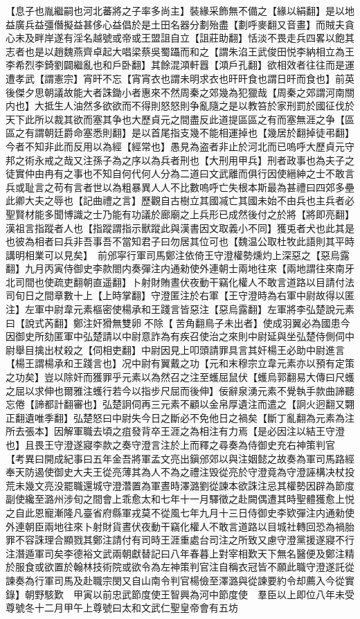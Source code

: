 【息子也胤繼嗣也河北蕃將之子率多尚主】裝緣采飾無不備之【緣以絹翻】是以地益廣兵益彊僭擬益甚侈心益倡於是土田名器分劃殆盡【劃呼麥翻又音畫】而賊夫貪心未及畔岸遂有淫名越號或帝或王盟詛自立【詛莊助翻】恬淡不畏走兵四畧以飽其志者也是以趙魏燕齊卓起大唱梁蔡吳蜀躡而和之【謂朱淊王武俊田悦李納相立為王李希烈李錡劉闢繼亂也和戶卧翻】其餘混澒軒囂【澒戶孔翻】欲相效者往往而是運遭孝武【謂憲宗】宵旰不忘【宵宵衣也謂未明求衣也旰旰食也謂日旰而食也】前英後傑夕思朝議故能大者誅鋤小者惠來不然周秦之郊幾為犯獵哉【周秦之郊謂河南關内也】大抵生人油然多欲欲而不得則怒怒則争亂隨之是以教笞於家刑罰於國征伐於天下此所以裁其欲而塞其争也大歷貞元之間盡反此道提區區之有而塞無涯之争【區區之有謂朝廷爵命塞悉則翻】是以首尾指支幾不能相運掉也【幾居於翻掉徒弔翻】今者不知非此而反用以為經【經常也】愚見為盗者非止於河北而已嗚呼大歷貞元守邦之術永戒之哉又注孫子為之序以為兵者刑也【大刑用甲兵】刑者政事也為夫子之徒實仲由冉有之事也不知自何代何人分為二道曰文武離而俱行因使縉紳之士不敢言兵或耻言之苟有言者世以為粗暴異人人不比數嗚呼亡失根本斯最為甚禮曰四郊多壘此卿大夫之辱也【記曲禮之言】歷觀自古樹立其國㓕亡其國未始不由兵也主兵者必聖賢材能多聞博識之士乃能有功議於廊廟之上兵形已成然後付之於將【將即亮翻】漢祖言指蹤者人也【指蹤謂指示獸蹤此與漢書因文取義小不同】獲兎者犬也此其是也彼為相者曰兵非吾事吾不當知君子曰勿居其位可也【魏温公取杜牧此語則其平時講明相業可以見矣】　前邠寜行軍司馬鄭注依倚王守澄權勢燻灼上深惡之【惡烏露翻】九月丙寅侍御史李款閤内奏彈注内通勑使外連朝士兩地往來【兩地謂往來南牙北司間也使疏吏翻朝直遥翻】卜射財賄晝伏夜動干竊化權人不敢言道路以目請付法司旬日之間章數十上【上時掌翻】守澄匿注於右軍【王守澄時為右軍中尉故得以匿注】左軍中尉韋元素樞密使楊承和王踐言皆惡注【惡烏露翻】左軍將李弘楚說元素曰【說式芮翻】鄭注奸猾無雙卵不除【苦角翻鳥子未出者】使成羽翼必為國患今因御史所劾匿軍中弘楚請以中尉意詐為有疾召使治之來則中尉延與坐弘楚侍側伺中尉舉目擒出杖殺之【伺相吏翻】中尉因見上叩頭請罪具言其奸楊王必助中尉進言【楊王謂楊承和王踐言也】况中尉有翼戴之功【元和末穆宗立韋元素亦以預有定策之功矣】豈以除奸而獲罪乎元素以為然召之注至蠖屈鼠伏【蠖烏郭翻易大傳曰尺蠖之屈以求伸也爾雅注蠖行若今以指步尺屈而後伸】佞辭泉湧元素不覺執手款曲諦聽忘倦【諦都計翻審也】弘楚詗伺再三元素不顧以金帛厚遺注而遣之【詗火迥翻又翾正翻遺唯季翻】弘楚怒曰中尉失今日之斷必不免他日之禍矣【斷丁亂翻為元素為注所去張本】因解軍職去頃之疽發背卒王涯之為相注有力焉【是必因注以結王守澄也】且畏王守澄遂寢李款之奏守澄言注於上而釋之尋奏為侍御史充右神策判官　【考異曰開成紀事曰五年金吾將軍孟文亮出鎭邠郊以與注姻懿之故奏為軍司馬路經奉天防遏使御史大夫王從亮薄其為人不為之禮注毁從亮於守澄竟為守澄誣構决杖投荒未幾文亮没罷職還城守澄濳置為軍晝時澤潞劉從諫本欲誅注忌其權勢因辟為節度副使纔至潞州涉旬之間會上乖愈太和七年十一月驛徵之赴闕偶遭其時聖體獲愈上悦之自此恩寵漸隆凡臺省府縣軍戎莫不從風七年九月十三日侍御史李欵彈注内通勑使外連朝臣兩地往來卜射財貨晝伏夜動干竊化權人不敢言道路以目城社轉回恐為禍胎罪不容誅理合顯戮其鄭注請付有司時王涯重處台司注之所致又慮守澄黨援遂寢不行注潛遁軍司矣李德裕文武兩朝獻替記曰八年春暮上對宰相歎天下無名醫便及鄭注精於服食或欲置於翰林技術院或欲令為左神策判官注自稱衣冠皆不願此職守澄遂託從諫奏為行軍司馬及赴職宗閔又自山南令判官楊儉至澤潞與從諫要約令却薦入今從實錄】朝野駭歎　甲寅以前忠武節度使王智興為河中節度使　羣臣以上即位八年未受尊號冬十二月甲午上尊號曰太和文武仁聖皇帝會有五坊